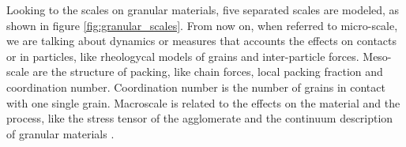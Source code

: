 



    


    Looking to the scales on granular materials, five separated scales are modeled, as shown in figure \ref{fig:granular_scales}. From now on, when referred to micro-scale, we are talking about dynamics or measures that accounts the effects on contacts or in particles, like rheologycal models of grains and inter-particle forces. Meso-scale are the structure of packing, like chain forces, local packing fraction and coordination number. Coordination number is the number of grains in contact with one single grain. Macroscale is related to the effects on the material and the process, like the stress tensor of the agglomerate and the continuum description of granular materials \cite{Modeling_Granular_Materials}.

